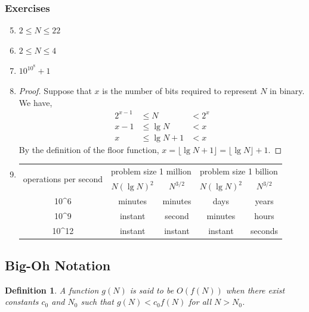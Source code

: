 \documentclass{article}
\newtheorem*{definition*}{Definition}
\begin{document}
\subsubsection*{Exercises}
\begin{enumerate}[label=2.\arabic*]
	\setcounter{enumi}{4}
	\item $2\le N \le 22$
	\item $2\le N\le4$
	      \setcounter{enumi}{7}
	\item $10^{10^8}+1$
	\item \begin{proof}
		      Suppose that $x$ is the number of bits required to represent $N$ in binary. We have,
		      \begin{align*}
			      2^{x-1} & \le N        & < 2^x \\
			      x-1     & \le \lg{N}   & < x   \\
			      x       & \le \lg{N}+1 & < x
		      \end{align*}
		      By the definition of the floor function, $x=\lfloor\lg{N}+1\rfloor=\lfloor\lg{N}\rfloor+1$.
	      \end{proof}
	\item \begin{tabular}{ccccc}
		      \multirow{2}{*}{operations per second} & \multicolumn{2}{c}{problem size 1 million} & \multicolumn{2}{c}{problem size 1 billion}                             \\
		                                             & $N(\lg{N})^2$                              & $N^{3/2}$                                  & $N(\lg{N})^2$ & $N^{3/2}$ \\
		      \hline
		      10^6                                   & minutes                                    & minutes                                    & days          & years     \\
		      10^9                                   & instant                                    & second                                     & minutes       & hours     \\
		      10^{12}                                & instant                                    & instant                                    & instant       & seconds
	      \end{tabular}
\end{enumerate}

\subsection{Big-Oh Notation}
\begin{definition*}
	A function $g(N)$ is said to be $O(f(N))$ when there exist constants $c_0$ and $N_0$ such that
	$g(N)<c_0f(N)$ for all $N>N_0$.
\end{definition*}
\end{document}
